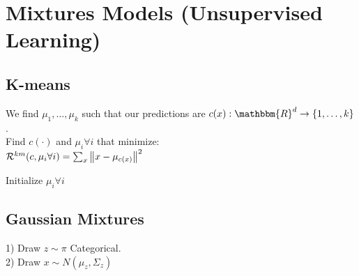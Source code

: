 
\section{Mixtures Models (Unsupervised Learning)}
\subsection*{K-means}
We find $\mu_1, \dots, \mu_k$ such that our predictions are $c(x):\mathbbm{R}^d\rightarrow \left\{1,\dots,k\right\}$. \\ 
Find $c(\cdot)$ and $\mu_i\forall i$ that minimize: \\
$\mathcal{R}^{km}(c,\mu_i \forall i) = \sum_x \left\lVert x-\mu_{c(x)}\right\rVert^2$\\
\begin{algorithm}[H]
     Initialize $\mu_i \forall i$\;
\end{algorithm}
\subsection*{Gaussian Mixtures}
	1) Draw $z\sim\pi$ Categorical.\\ 
	2) Draw $x\sim N(\mu_z, \Sigma_z)$
	
